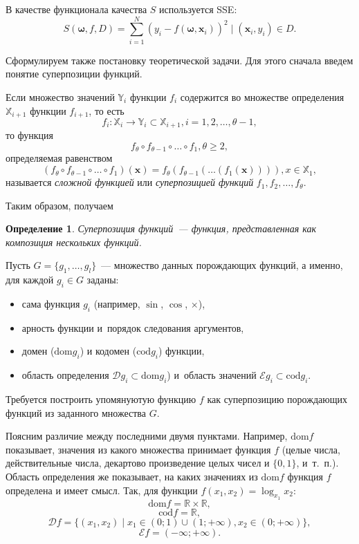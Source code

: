 \documentclass[12pt,a4paper]{amsart}
\newtheorem{defin}{Определение}
\begin{document}
В качестве функционала качества $S$ используется SSE:
\begin{equation}
  \label{eq:sse_expr}
  S(\boldsymbol{\omega}, f, D) = \sum_{i=1}^N (y_i - f (\boldsymbol{\omega}, \mathbf{x}_i))^2 \mid (\mathbf{x}_i, y_i) \in D.
\end{equation}

Сформулируем также постановку теоретической задачи. Для этого сначала
введем понятие суперпозиции функций.

Если множество значений $\mathbb{Y}_i$ функции $f_i$ содержится во множестве
определения $\mathbb{X}_{i+1}$ функции $f_{i+1}$, то есть
\[
f_i : \mathbb{X}_i \to \mathbb{Y}_i \subset \mathbb{X}_{i+1}, i = 1, 2, \dots, \theta - 1,
\]
то функция
\[
f_\theta \circ f_{\theta-1} \circ \dots \circ f_1, \theta \geq 2,
\]
определяемая равенством
\[
(f_\theta \circ f_{\theta-1} \circ \dots \circ f_1) (\mathbf{x}) =
  f_{\theta} (f_{\theta-1} (\dots (f_1 (\mathbf{x})))), x \in \mathbb{X}_1,
\]
называется \emph{сложной функцией}\cite{MathEnc1984_4} или
\emph{суперпозицией функций} $f_1, f_2, \dots, f_\theta$.

Таким образом, получаем
\begin{defin}
  Суперпозиция функций~--- функция, представленная как композиция нескольких
  функций. 
\end{defin}

Пусть $G = \{ g_1, \dots, g_l \}$~--- множество данных порождающих
функций, а именно, для каждой $g_i \in G$ заданы:
\begin{itemize}
  \item сама функция $g_i$ (например, $\sin$, $\cos$, $\times$),
  \item арность функции и~порядок следования аргументов,
  \item домен ($\text{dom} g_i$) и кодомен ($\text{cod} g_i$) функции,
  \item область определения $\mathcal{D} g_i \subset \text{dom} g_i$) и~область
	значений $\mathcal{E} g_i \subset \text{cod} g_i$.
\end{itemize}
Требуется построить упомянуютую функцию $f$ как суперпозицию порождающих
функций из заданного множества $G$.

Поясним различие между последними двумя пунктами. Например, $\text{dom} f$
показывает, значения из какого множества принимает функция $f$ (целые числа,
действительные числа, декартово произведение целых чисел и $\{0, 1\}$,
и~т.~п.). Область определения же показывает, на каких значениях из
$\text{dom} f$ функция $f$ определена и имеет смысл. Так, для функции
$f(x_1, x_2) = \log_{x_1} x_2$:
\[
  \text{dom} f = \mathbb{R} \times \mathbb{R},
\]
\[
  \text{cod} f = \mathbb{R},
\]
\[
  \mathcal{D} f = \{ (x_1, x_2) \mid x_1 \in (0; 1) \cup (1; +\infty), x_2 \in (0; +\infty) \},
\]
\[
  \mathcal{E} f = (-\infty; +\infty).
\]
\end{document}
